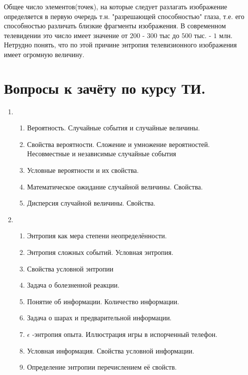 ﻿\documentclass[a4paper,12pt]{report}
\begin{document}
	Общее число элементов(точек), на которые следует разлагать изображение определяется в первую очередь т.н. "разрешающей способностью" глаза, т.е. его способностью различать близкие фрагменты изображения. В современном телевидении это число имеет значение от $200$ - $300$ тыс до $500$ тыс. - $1$ млн. Нетрудно понять, что по этой причине энтропия телевизионного изображения имеет огромную величину.
	



	\pagebreak

	\section{Вопросы к зачёту по курсу ТИ.}
	
	
	\begin{enumerate}
	
	\item	\begin{enumerate}
		\item	Вероятность. Случайные события и случайные величины.
		\item	Свойства вероятности. Сложение и умножение вероятностей. Несовместные и независимые случайные события
		\item	Условные вероятности и их свойства.
		\item	Математическое ожидание случайной величины. Свойства.
		\item	Дисперсия случайной величины. Свойства.
		\end{enumerate}		
	
	\item	\begin{enumerate}
		\item	Энтропия как мера степени неопределённости.
		\item	Энтропия сложных событий. Условная энтропия.
		\item	Свойства условной энтропии
		\item	Задача о болезненной реакции.
		\item	Понятие об информации. Количество информации.
		\item	Задача о шарах и предварительной информации.
		\item	$\epsilon$ -энтропия опыта. Иллюстрация игры в испорченный телефон.
		\item	Условная информация. Свойства условной информации.
		\item	Определение энтропии перечислением её свойств.
		\end{enumerate}		


\end{enumerate}
\end{document}
